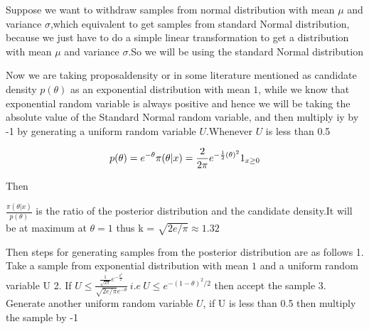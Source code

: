 \documentclass[
]{article}
\begin{document}
Suppose we want to withdraw samples from normal distribution with mean
\(\mu\) and variance \(\sigma\),which equivalent to get samples from
standard Normal distribution, because we just have to do a simple linear
transformation to get a distribution with mean \(\mu\) and variance
\(\sigma\).So we will be using the standard Normal distribution

Now we are taking proposaldensity or in some literature mentioned as
candidate density \(p(\theta)\) as an exponential distribution with mean
\(1\), while we know that exponential random variable is always positive
and hence we will be taking the absolute value of the Standard Normal
random variable, and then multiply iy by -1 by generating a uniform
random variable \(U\).Whenever \(U\) is less than 0.5

\[
p(\theta) = e^{-\theta}  \\
\pi(\theta|x) = \frac{2}{2\pi}  e^{-\frac{1}{2}(\theta)^2}1_{x \geq0}
\]

Then

\(\frac{\pi(\theta|x)}{p(\theta)}\) is the ratio of the posterior
distribution and the candidate density.It will be at maximum at
\(\theta = 1\) thus k = \(\sqrt{2e / \pi} \approx 1.32\)

Then steps for generating samples from the posterior distribution are as
follows 1. Take a sample from exponential distribution with mean \(1\)
and a uniform random variable U 2. If
\(U \leq \frac{\frac{1}{\sqrt{2\pi}}e^{-\frac{\theta^2}{2}}}{\sqrt{2e/\pi} e^{-\theta}} \ i.e \ U \leq e^{-(1 -\theta)^2/2}\)
then accept the sample 3. Generate another uniform random variable
\(U\), if U is less than 0.5 then multiply the sample by -1
\end{document}
